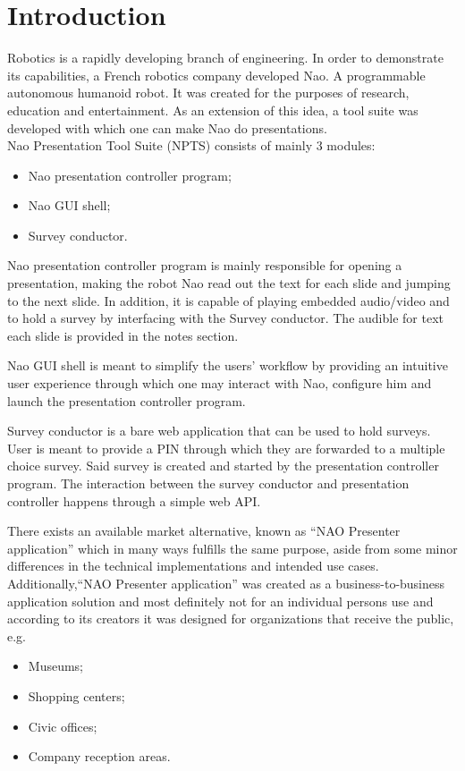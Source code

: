 \documentclass[12pt, fleqn, a4paper]{article}
\begin{document}
\section*{\centering Introduction}
Robotics is a rapidly developing branch of engineering. In order to demonstrate its capabilities, a French robotics company developed Nao. A programmable autonomous humanoid robot. It was created for the purposes of research, education and entertainment. As an extension of this idea, a tool suite was developed with which one can make Nao do presentations.\\
Nao Presentation Tool Suite (NPTS) consists of mainly 3 modules:
\begin{itemize}
	\item Nao presentation controller program;
	\item Nao GUI shell;
	\item Survey conductor.
\end{itemize}\par
Nao presentation controller program is mainly responsible for opening a presentation, making the robot Nao read out the text for each slide and jumping to the next slide. In addition, it is capable of playing embedded audio/video and to hold a survey by interfacing with the Survey conductor. The audible for text each slide is provided in the notes section. \par
Nao GUI shell is meant to simplify the users' workflow by providing an intuitive user experience through which one may interact with Nao, configure him and launch the presentation controller program.\par
Survey conductor is a bare web application that can be used to hold surveys. User is meant to provide a PIN through which they are forwarded to a multiple choice survey. Said survey is created and started by the presentation controller program. The interaction between the survey conductor and presentation controller happens through a simple web API.\par
There exists an available market alternative, known as \enquote{NAO Presenter application} which in many ways fulfills the same purpose, aside from some minor differences in the technical implementations and intended use cases. Additionally,\enquote{NAO Presenter application} was created as a business-to-business application solution and most definitely not for an individual persons use and according to its creators it was designed for organizations that receive the public, e.g.
\begin{itemize}
	\item Museums;
	\item Shopping centers;
	\item Civic offices;
	\item Company reception areas.
\end{itemize}
\end{document}
